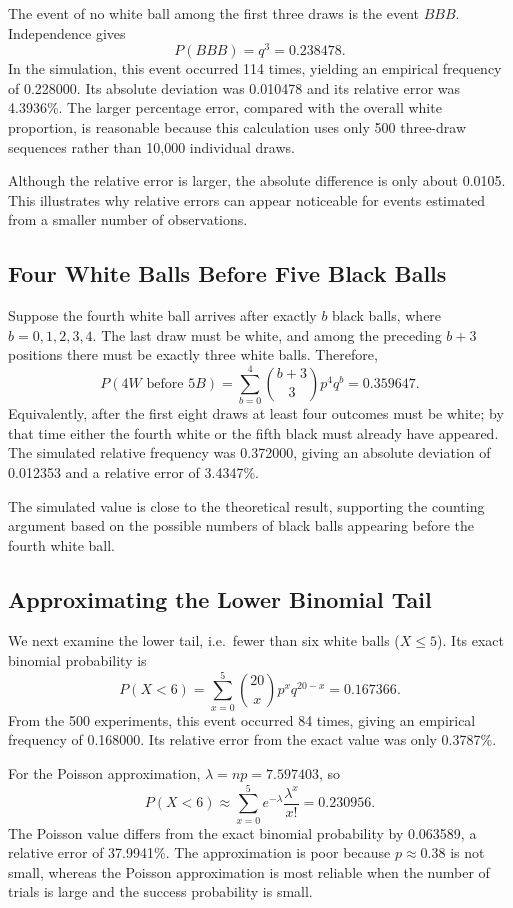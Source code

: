\documentclass[12pt]{article}
\theoremstyle{definition}
\numberwithin{equation}{section}
\begin{document}
The event of no white ball among the first three draws is the event \(BBB\). Independence gives
\[
P(BBB)=q^3=0.238478.
\]
In the simulation, this event occurred 114 times, yielding an empirical frequency of 0.228000. Its absolute deviation was 0.010478 and its relative error was 4.3936\%. The larger percentage error, compared with the overall white proportion, is reasonable because this calculation uses only 500 three-draw sequences rather than 10,000 individual draws.

Although the relative error is larger, the absolute difference is only about 0.0105. This illustrates why relative errors can appear noticeable for events estimated from a smaller number of observations.

\subsection{Four White Balls Before Five Black Balls}

Suppose the fourth white ball arrives after exactly \(b\) black balls, where \(b=0,1,2,3,4\). The last draw must be white, and among the preceding \(b+3\) positions there must be exactly three white balls. Therefore,
\[
P(4W\text{ before }5B)
=\sum_{b=0}^{4}\binom{b+3}{3}p^4q^b
=0.359647.
\]
Equivalently, after the first eight draws at least four outcomes must be white; by that time either the fourth white or the fifth black must already have appeared. The simulated relative frequency was 0.372000, giving an absolute deviation of 0.012353 and a relative error of 3.4347\%.

The simulated value is close to the theoretical result, supporting the counting argument based on the possible numbers of black balls appearing before the fourth white ball.

\subsection{Approximating the Lower Binomial Tail}

We next examine the lower tail, i.e.\ fewer than six white balls (\(X\leq5\)). Its exact binomial probability is
\[
P(X<6)=\sum_{x=0}^{5}\binom{20}{x}p^xq^{20-x}=0.167366.
\]
From the 500 experiments, this event occurred 84 times, giving an empirical frequency of 0.168000. Its relative error from the exact value was only 0.3787\%.

For the Poisson approximation, \(\lambda=np=7.597403\), so
\[
P(X<6)\approx \sum_{x=0}^{5}e^{-\lambda}\frac{\lambda^x}{x!}=0.230956.
\]
The Poisson value differs from the exact binomial probability by 0.063589, a relative error of 37.9941\%. The approximation is poor because \(p\approx0.38\) is not small, whereas the Poisson approximation is most reliable when the number of trials is large and the success probability is small.
\end{document}
